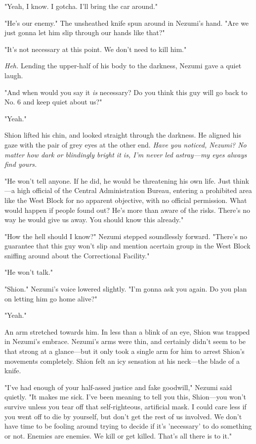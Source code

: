 "Yeah, I know. I gotcha. I'll bring the car around."

"He's our enemy." The unsheathed knife spun around in Nezumi's hand.
"Are we just gonna let him slip through our hands like that?"

"It's not necessary at this point. We don't need to kill him."

\emph{Heh.} Lending the upper-half of his body to the darkness, Nezumi gave a
quiet laugh.

"And when would you say it \emph{is} necessary? Do you think this guy will go
back to No. 6 and keep quiet about us?"

"Yeah."

Shion lifted his chin, and looked straight through the darkness. He
aligned his gaze with the pair of grey eyes at the other end. \emph{Have you
noticed, Nezumi? No matter how dark or blindingly bright it is, I'm
never led astray---my eyes always find yours.}

"He won't tell anyone. If he did, he would be threatening his own life.
Just think---a high official of the Central Administration Bureau,
entering a prohibited area like the West Block for no apparent
objective, with no official permission. What would happen if people
found out? He's more than aware of the risks. There's no way he would
give us away. You should know this already."

"How the hell should I know?" Nezumi stepped soundlessly forward.
"There's no guarantee that this guy won't slip and mention a\el certain
group in the West Block sniffing around about the Correctional
Facility."

"He won't talk."

"Shion." Nezumi's voice lowered slightly. "I'm gonna ask you again. Do
you plan on letting him go home alive?"

"Yeah."

An arm stretched towards him. In less than a blink of an eye, Shion was
trapped in Nezumi's embrace. Nezumi's arms were thin, and certainly
didn't seem to be that strong at a glance---but it only took a single arm
for him to arrest Shion's movements completely. Shion felt an icy
sensation at his neck---the blade of a knife.

"I've had enough of your half-assed justice and fake goodwill," Nezumi
said quietly. "It makes me sick. I've been meaning to tell you this,
Shion---you won't survive unless you tear off that self-righteous,
artificial mask. I could care less if you went off to die by yourself,
but don't get the rest of us involved. We don't have time to be fooling
around trying to decide if it's 'necessary' to do something or not.
Enemies are enemies. We kill or get killed. That's all there is to it."

